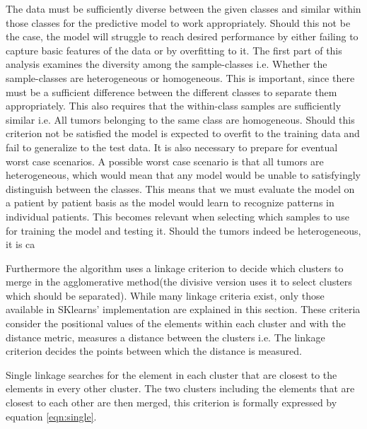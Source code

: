 The data must be sufficiently diverse between the given classes and similar within those classes for the predictive model to work appropriately. Should this not be the case, the model will struggle to reach desired performance by either failing to capture basic features of the data or by overfitting to it. The first part of this analysis examines the diversity among the sample-classes i.e. Whether the sample-classes are heterogeneous or homogeneous. This is important, since there must be a sufficient difference between the different classes to separate them appropriately. This also requires that the within-class samples are sufficiently similar i.e. All tumors belonging to the same class are homogeneous. Should this criterion not be satisfied the model is expected to overfit to the training data and fail to generalize to the test data. It is also necessary to prepare for eventual worst case scenarios. A possible worst case scenario is that all tumors are heterogeneous, which would mean that any model would be unable to satisfyingly distinguish between the classes. This means that we must evaluate the model on a patient by patient basis as the model would learn to recognize patterns in individual patients. This becomes relevant when selecting which samples to use for training the model and testing it. Should the tumors indeed be heterogeneous, it is ca  



Furthermore the algorithm uses a linkage criterion to decide which clusters to merge in the agglomerative method(the divisive version uses it to select clusters which should be separated). While many linkage criteria exist, only those available in SKlearns' implementation are explained in this section\cite{scikit}. These criteria consider the positional values of the elements within each cluster and with the distance metric, measures a distance between the clusters i.e. The linkage criterion decides the points between which the distance is measured.

Single linkage searches for the element in each cluster that are closest to the elements in every other cluster. The two clusters including the elements that are closest to each other are then merged, this criterion is formally expressed by equation \ref{eqn:single}.

